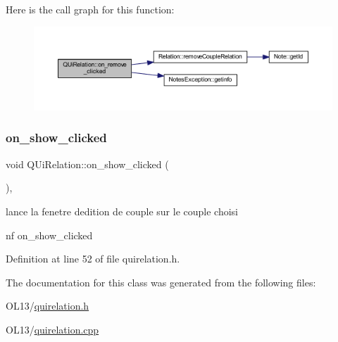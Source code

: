 Here is the call graph for this function\+:\nopagebreak
\begin{figure}[H]
\begin{center}
\leavevmode
\includegraphics[width=350pt]{class_q_ui_relation_a14fddadaa70fa8c82a0e49a547e2f6b5_cgraph}
\end{center}
\end{figure}
\mbox{\label{class_q_ui_relation_a66b413fb02bae1c7ce504395655cd47f}} 
\subsubsection{\texorpdfstring{on\+\_\+show\+\_\+clicked}{on\_show\_clicked}}
{\footnotesize\ttfamily void Q\+Ui\+Relation\+::on\+\_\+show\+\_\+clicked (\begin{DoxyParamCaption}{ }\end{DoxyParamCaption})\hspace{0.3cm}{\ttfamily [inline]}, {\ttfamily [slot]}}



lance la fenetre d\textquotesingle{}edition de couple sur le couple choisi 

nf on\+\_\+show\+\_\+clicked 

Definition at line 52 of file quirelation.\+h.



The documentation for this class was generated from the following files\+:\begin{DoxyCompactItemize}
\item 
O\+L13/\hyperlink{quirelation_8h}{quirelation.\+h}\item 
O\+L13/\hyperlink{quirelation_8cpp}{quirelation.\+cpp}\end{DoxyCompactItemize}
